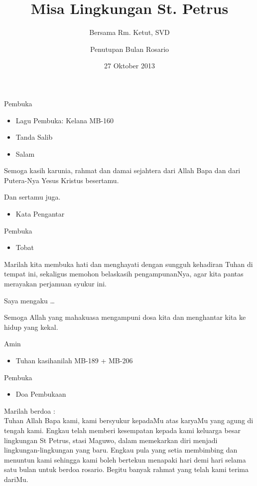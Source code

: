 \documentclass[12pt,a4paper]{beamer}
\author{Penutupan Bulan Rosario}
\title{Misa Lingkungan St. Petrus}
\subtitle{Bersama Rm. Ketut, SVD}
\date{27 Oktober 2013 }
\begin{document}
\maketitle
\begin{frame}{Pembuka}

\begin{itemize}
\item Lagu Pembuka: Kelana MB-160
\item Tanda Salib
\item Salam
\end{itemize}
\begin{description}[1cm]
\item [I] 	Semoga kasih karunia, rahmat dan damai sejahtera dari Allah Bapa dan dari Putera-Nya Yesus Kristus besertamu.
\item [U] 	Dan sertamu juga.
\end{description} 

\begin{itemize}
\item Kata Pengantar
\end{itemize}
\end{frame}

\begin{frame}{Pembuka}
\begin{itemize}
\item Tobat
\end{itemize}

\begin{description}[1cm]
\item [I]  Marilah kita membuka hati dan menghayati dengan sungguh kehadiran Tuhan di tempat ini, sekaligus memohon belaskasih pengampunanNya, agar kita pantas merayakan perjamuan syukur ini.
\item [U]	Saya mengaku \ldots
\item [I]	Semoga Allah yang mahakuasa mengampuni dosa kita dan menghantar kita ke hidup yang kekal. 
\item [U] Amin
\end{description}
\begin{itemize}
\item Tuhan kasihanilah MB-189 + MB-206
\end{itemize}
\end{frame}

\begin{frame}{Pembuka}
\begin{itemize}
\item Doa Pembukaan
\end{itemize}
\begin{description}[1cm]
\item [I] Marilah berdoa :\\
	Tuhan Allah Bapa kami, kami bersyukur kepadaMu atas karyaMu yang agung di tengah kami. Engkau telah memberi kesempatan kepada kami keluarga besar lingkungan St Petrus, stasi Maguwo, dalam memekarkan diri menjadi lingkungan-lingkungan yang baru. Engkau pula yang setia membimbing dan menuntun kami sehingga kami boleh bertekun menapaki hari demi hari selama satu bulan untuk berdoa rosario. Begitu banyak rahmat yang telah kami terima dariMu. 
\end{description}
\end{frame}
\end{document}
